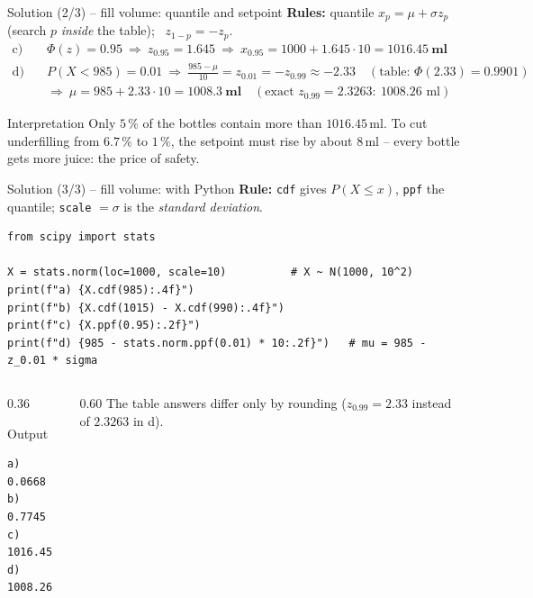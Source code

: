 \documentclass[aspectratio=169,11pt]{beamer}
\begin{document}
\begin{frame}{Solution (2/3) -- fill volume: quantile and setpoint}
  \textbf{Rules:} quantile $x_p=\mu+\sigma z_p$ (search $p$ \emph{inside} the
  table); \ $z_{1-p}=-z_p$.
  \begin{align*}
    \text{c)}\quad &\Phi(z)=0.95\ \Rightarrow\ z_{0.95}=1.645
       \ \Rightarrow\ x_{0.95}=1000+1.645\cdot10=\mathbf{1016.45\ ml}\\[4pt]
    \text{d)}\quad &P(X<985)=0.01\ \Rightarrow\
       \tfrac{985-\mu}{10}=z_{0.01}=-z_{0.99}\approx-2.33
       \quad(\text{table: }\Phi(2.33)=0.9901)\\
     &\Rightarrow\ \mu=985+2.33\cdot10=\mathbf{1008.3\ ml}
       \quad(\text{exact } z_{0.99}=2.3263:\ 1008.26\text{ ml})
  \end{align*}
  \begin{exampleblock}{Interpretation}
    Only $5\,\%$ of the bottles contain more than $1016.45$\,ml. To cut
    underfilling from $6.7\,\%$ to $1\,\%$, the setpoint must rise by about
    $8$\,ml -- every bottle gets more juice: the price of safety.
  \end{exampleblock}
\end{frame}

\begin{frame}[fragile]{Solution (3/3) -- fill volume: with Python}
  \textbf{Rule:} \texttt{cdf} gives $P(X\le x)$, \texttt{ppf} the quantile;
  \texttt{scale} $=\sigma$ is the \emph{standard deviation}.
\begin{lstlisting}
from scipy import stats

X = stats.norm(loc=1000, scale=10)          # X ~ N(1000, 10^2)
print(f"a) {X.cdf(985):.4f}")
print(f"b) {X.cdf(1015) - X.cdf(990):.4f}")
print(f"c) {X.ppf(0.95):.2f}")
print(f"d) {985 - stats.norm.ppf(0.01) * 10:.2f}")   # mu = 985 - z_0.01 * sigma
\end{lstlisting}
  \begin{columns}[T]
    \begin{column}{0.36\textwidth}
      \begin{block}{Output}
\begin{lstlisting}[style=Pyout]
a) 0.0668
b) 0.7745
c) 1016.45
d) 1008.26
\end{lstlisting}
      \end{block}
    \end{column}
    \begin{column}{0.60\textwidth}
      \footnotesize The table answers differ only by rounding
      ($z_{0.99}=2.33$ instead of $2.3263$ in d).
    \end{column}
  \end{columns}
\end{frame}
\end{document}
